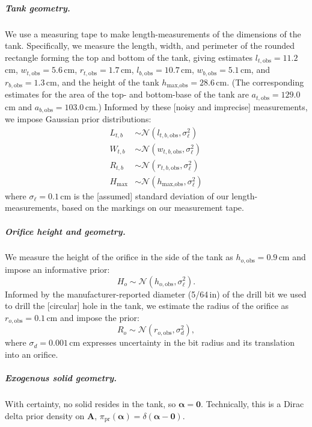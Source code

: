 \documentclass[a4paper,fleqn]{cas-dc}
\begin{document}
\subparagraph{Tank geometry.} We use a measuring tape to make length-measurements of the dimensions of the tank.
Specifically, we measure the length, width, and perimeter of the rounded rectangle forming the top and bottom of the tank, giving estimates 
$l_{t, \text{obs}}=11.2$\,cm, $w_{t, \text{obs}}=5.6$\,cm, $r_{t, \text{obs}}=1.7$\,cm,
$l_{b, \text{obs}}=10.7$\,cm, $w_{b, \text{obs}}=5.1$\,cm, and $r_{b, \text{obs}}=1.3$\,cm, and the height of the tank $h_{\text{max}, \text{obs}}=28.6$\,cm.
(The corresponding estimates for the area of the top- and bottom-base of the tank are $a_{t, \text{obs}}=129.0$\,cm and $a_{b, \text{obs}}=103.0$\,cm.)
Informed by these [noisy and imprecise] measurements, we impose Gaussian prior distributions:
\begin{align}
L_{t,b} &\sim \mathcal{N}(l_{t,b, \text{obs}}, \sigma_\ell^2) \\
W_{t,b} &\sim \mathcal{N}(w_{t,b, \text{obs}}, \sigma_\ell^2) \\
R_{t,b} &\sim \mathcal{N}(r_{t,b, \text{obs}}, \sigma_\ell^2) \\
H_{\text{max}} &\sim \mathcal{N}(h_{\text{max}, \text{obs}}, \sigma_\ell^2)
\end{align}
where $\sigma_\ell=0.1$\,cm is the [assumed] standard deviation of our length-measurements, based on the markings on our measurement tape. 


\subparagraph{Orifice height and geometry.} 
We measure the height of the orifice in the side of the tank as $h_{o, \text{obs}}=0.9$\,cm and impose an informative prior:
\begin{equation}
H_o \sim \mathcal{N}(h_{o, \text{obs}}, \sigma_\ell^2).
\end{equation}
Informed by the manufacturer-reported diameter (5/64\,in) of the drill bit we used to drill the [circular] hole in the tank, we estimate the radius of the orifice as $r_{o, \text{obs}}=0.1$\,cm and impose the prior:
\begin{equation}
R_o \sim \mathcal{N}(r_{o, \text{obs}}, \sigma_d^2), \label{eq:R_o_prior}
\end{equation}
where $\sigma_d= 0.001$\,cm expresses uncertainty in the bit radius and its translation into an orifice.


\subparagraph{Exogenous solid geometry.}
With certainty, no solid resides in the tank, so $\boldsymbol \alpha=\mathbf{0}$. Technically, this is a Dirac delta prior density on $\mathbf{A}$, $\pi_{\text{pr}}(\boldsymbol \alpha)=\delta(\boldsymbol \alpha - \mathbf{0})$. 
\end{document}
